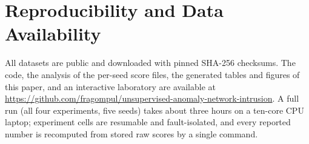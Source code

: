 \documentclass[journal]{IEEEtran}
\begin{document}
\section*{Reproducibility and Data Availability}
All datasets are public and downloaded with pinned SHA-256 checksums. The code, the analysis of the per-seed score files, the generated tables and figures of this paper, and an interactive laboratory are available at \url{https://github.com/fragompul/unsupervised-anomaly-network-intrusion}. A full run (all four experiments, five seeds) takes about three hours on a ten-core CPU laptop; experiment cells are resumable and fault-isolated, and every reported number is recomputed from stored raw scores by a single command.

\FloatBarrier


\end{document}
